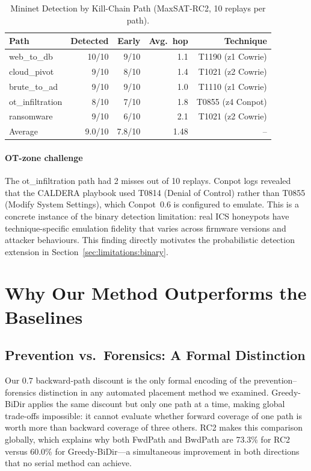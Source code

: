 \documentclass[journal]{IEEEtran}
\begin{document}
\begin{table}[t]
\caption{Mininet Detection by Kill-Chain Path (MaxSAT-RC2,
  10 replays per path).}
\label{tab:emulation_paths}
\centering
\renewcommand{\arraystretch}{1.2}
\begin{tabular}{lrrrr}
\toprule
Path & Detected & Early & Avg.\ hop & Technique \\
\midrule
web\_to\_db      & 10/10 & 9/10 & 1.1 & T1190 (z1 Cowrie) \\
cloud\_pivot     & 9/10  & 8/10 & 1.4 & T1021 (z2 Cowrie) \\
brute\_to\_ad    & 9/10  & 9/10 & 1.0 & T1110 (z1 Cowrie) \\
ot\_infiltration & 8/10  & 7/10 & 1.8 & T0855 (z4 Conpot) \\
ransomware       & 9/10  & 6/10 & 2.1 & T1021 (z2 Cowrie) \\
\midrule
Average & 9.0/10 & 7.8/10 & 1.48 & -- \\
\bottomrule
\end{tabular}
\end{table}

\paragraph{OT-zone challenge}
The ot\_infiltration path had 2 misses out of 10 replays. Conpot
logs revealed that the CALDERA playbook used T0814 (Denial of Control)
rather than T0855 (Modify System Settings), which Conpot~0.6 is
configured to emulate. This is a concrete instance of the binary
detection limitation: real ICS honeypots have technique-specific
emulation fidelity that varies across firmware versions and attacker
behaviours. This finding directly motivates the probabilistic
detection extension in Section~\ref{sec:limitations:binary}.

\section{Why Our Method Outperforms the Baselines}
\label{sec:why}

\subsection{Prevention vs.\ Forensics: A Formal Distinction}
Our $0.7$ backward-path discount is the only formal encoding of the
prevention--forensics distinction in any automated placement method
we examined. Greedy-BiDir applies the same discount but only one
path at a time, making global trade-offs impossible: it cannot
evaluate whether forward coverage of one path is worth more than
backward coverage of three others. RC2 makes this comparison
globally, which explains why both FwdPath and BwdPath are 73.3\%
for RC2 versus 60.0\% for Greedy-BiDir---a simultaneous improvement
in both directions that no serial method can achieve.
\end{document}
